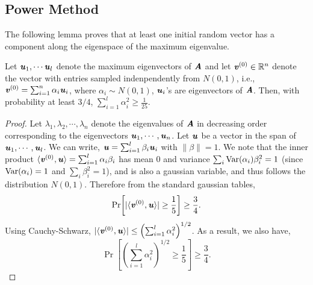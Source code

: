 \subsection*{Power Method}

The following lemma proves that at least one initial random vector has a component along the eigenspace of the maximum eigenvalue.
\begin{lemma}\label{lem:PMHighComp}
Let $\uu_1,\cdots \uu_l$ denote the maximum eigenvectors of $\AA$ and let $\vv^{(0)} \in \mathbb{R}^n$ denote the vector with entries sampled indenpendently from $N(0,1)$, i.e., $\vv^{(0)} = \sum_{i=1}^n\alpha_i\uu_i$, where $\alpha_i \sim N(0,1)$, $\uu_i$'s are eigenvectors of $\AA$. Then, with probability at least $3/4$, $\sum_{i=1}^l\alpha_i^2 \geq \frac{1}{25}$.
\end{lemma}
\begin{proof}
Let $\lambda_1,\lambda_2,\cdots, \lambda_n$ denote the eigenvalues of $\AA$ in decreasing order corresponding to the eigenvectors $\uu_1,\cdots, \uu_n$.  Let $\uu$ be a vector in the span of $\uu_1,\cdots, \uu_l$. We can write, $\uu=\sum_{i=1}^l \beta_i\uu_i$ with $\|\beta\| = 1$. We note that the inner product $\langle \vv^{(0)},\uu\rangle = \sum_{i=1}^l \alpha_i \beta_i$ has mean $0$ and variance $\sum_i \Var(\alpha_i)\beta_i^2 = 1$ (since $\Var(\alpha_i) =1$ and $\sum_i \beta_i^2 = 1$), and is also a gaussian variable, and thus follows the distribution $N(0,1)$. Therefore from the standard gaussian tables, 
\[
\Pr\left[|\langle \vv^{(0)},\uu\rangle|\geq \frac{1}{5}\right] \geq \frac{3}{4}.
\]
Using Cauchy-Schwarz, $|\langle \vv^{(0)},\uu\rangle| \leq \left(\sum_{i=1}^l\alpha_i^2\right)^{1/2}$. As a result, we also have,
\[
\Pr\left[\left(\sum_{i=1}^l\alpha_i^2\right)^{1/2}\geq \frac{1}{5}\right] \geq \frac{3}{4}.
\] 
\end{proof}

